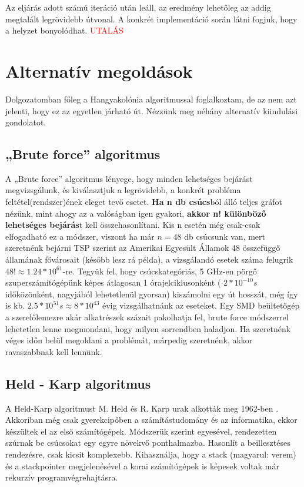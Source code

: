 Az eljárás adott számú iteráció után leáll, az eredmény lehetőleg az addig megtalált legrövidebb útvonal. A konkrét implementáció során látni fogjuk, hogy a helyzet bonyolódhat. \textcolor{red}{UTALÁS}


\section{Alternatív megoldások}

Dolgozatomban főleg a Hangyakolónia algoritmussal foglalkoztam, de  az nem azt jelenti, hogy ez az egyetlen járható út. Nézzünk meg néhány alternatív kiindulási gondolatot.

\subsection{„Brute force” algoritmus}
A „Brute force” algoritmus lényege, hogy minden lehetséges bejárást megvizsgálunk, és kiválasztjuk a legrövidebb, a konkrét probléma feltétel(rendszer)ének eleget tevő esetet. \textbf{Ha n db csúcs}ból álló teljes gráfot nézünk, mint ahogy az a valóságban igen gyakori, \textbf{akkor n! különböző lehetséges bejárás}t kell összehasonlítani. Kis n esetén még csak-csak elfogadható ez a módszer, viszont ha már \(n=48\) db csúcsunk van, mert szeretnénk bejárni TSP szerint az Amerikai Egyesült Államok 48 összefüggő államának fővárosait (később lesz rá példa), a vizsgálandó esetek száma felugrik \( 48! \approx 1.24 * 10^{61} \)-re. Tegyük fel, hogy csúcskategóriás, 5 GHz-en pörgő szuperszámítógépünk képes átlagosan 1 órajelciklusonként (  \(2*10^{-10}s\) időközönként, nagyjából lehetetlenül gyorsan) kiszámolni egy út hosszát, még így is kb. \(2.5 * 10^{51}s \approx 8 * 10^{43} \) évig vizsgálhatnánk az eseteket. Egy SMD beültetőgép a szerelőlemezre akár alkatrészek százait pakolhatja fel, brute force módszerrel lehetetlen lenne megmondani, hogy milyen sorrendben haladjon. Ha szeretnénk véges időn belül megoldani a problémát, márpedig szeretnénk, akkor ravaszabbnak kell lennünk.

\subsection{Held - Karp algoritmus }
A Held-Karp algoritmust M. Held és R. Karp urak alkották meg 1962-ben \cite{HeldKarp}. Akkoriban még csak gyerekcipőben a számítástudomány és az informatika, ekkor készültek el az első számítógépek. Módszerük szerint egyesével, rendezetten szúrnak be csúcsokat egy egyre növekvő ponthalmazba. Hasonlít a beillesztéses rendezésre, csak kicsit komplexebb. Kihasználja, hogy a stack (magyarul: verem) és a stackpointer megjelenésével a korai számítógépek is képesek voltak már rekurzív programvégrehajtásra.

